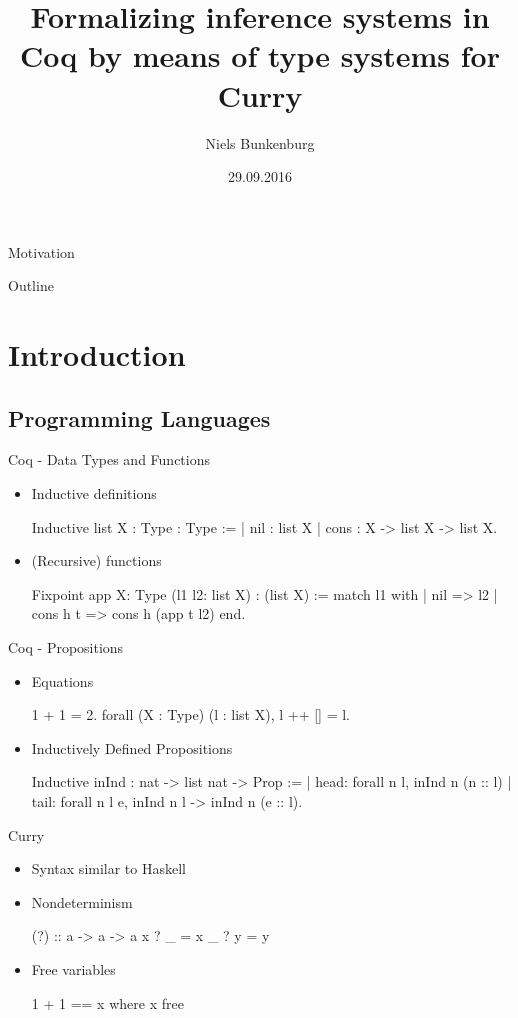 \documentclass{beamer}
\title{Formalizing inference systems in Coq by means of type systems for Curry}
\author{Niels Bunkenburg}
\institute{ 
	Programming Languages and Compiler Construction \par
	Department of Computer Science \par
	Christian-Albrechts-University of Kiel}
\date[Short Occasion] %
{29.09.2016}
\begin{document}
\begin{frame}
  \titlepage
\end{frame}

\begin{frame}{Motivation}

\end{frame}
\begin{frame}{Outline}
  \tableofcontents
\end{frame}

\section{Introduction}
\subsection{Programming Languages}
\begin{frame}[fragile]{Coq - Data Types and Functions}
\begin{itemize}
\item Inductive definitions
\begin{coqcode}
Inductive list {X : Type} : Type :=
  | nil  : list X
  | cons : X -> list X -> list X.
\end{coqcode}
\vfill
\pause
\item (Recursive) functions
\begin{coqcode}
Fixpoint app {X: Type} (l1 l2: list X) : (list X) :=
  match l1 with
  | nil => l2
  | cons h t => cons h (app t l2)
  end.
\end{coqcode}
\end{itemize}
\end{frame}
\begin{frame}[fragile]{Coq - Propositions}
\begin{itemize}
\item Equations
\begin{coqcode}
1 + 1 = 2.
forall (X : Type) (l : list X), l ++ [] = l.
\end{coqcode}
\vfill
\item Inductively Defined Propositions
\begin{coqcode}
Inductive inInd : nat -> list nat -> Prop :=
 | head: forall n l, inInd n (n :: l)
 | tail: forall n l e, inInd n l -> inInd n (e :: l).
\end{coqcode}
\end{itemize}
\end{frame}
\begin{frame}[fragile]{Curry}
\begin{itemize}
\item Syntax similar to Haskell
\item Nondeterminism
\begin{haskellcode}
(?)   :: a -> a -> a
x ? _ = x
_ ? y = y
\end{haskellcode}
\item Free variables
\begin{coqcode}
1 + 1 == x where x free
\end{coqcode}
\end{itemize}
\end{frame}
\end{document}
